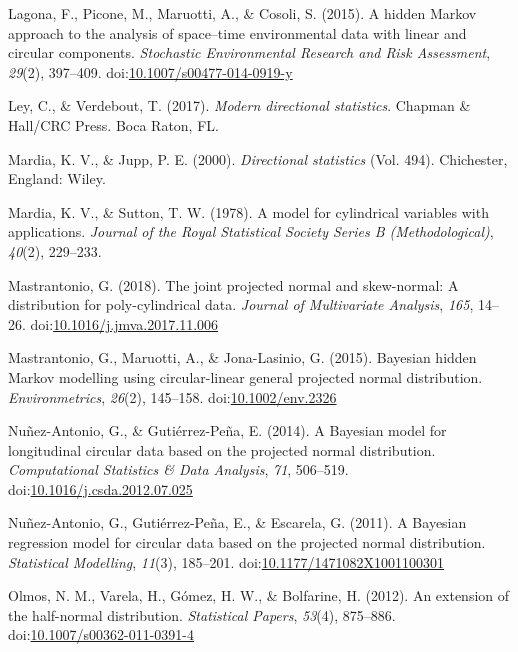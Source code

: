 \documentclass[12pt,]{article}
\begin{document}
\hypertarget{ref-lagona2015hidden}{}
Lagona, F., Picone, M., Maruotti, A., \& Cosoli, S. (2015). A hidden
Markov approach to the analysis of space--time environmental data with
linear and circular components. \emph{Stochastic Environmental Research
and Risk Assessment}, \emph{29}(2), 397--409.
doi:\href{https://doi.org/10.1007/s00477-014-0919-y}{10.1007/s00477-014-0919-y}

\hypertarget{ref-ley2017modern}{}
Ley, C., \& Verdebout, T. (2017). \emph{Modern directional statistics}.
Chapman \& Hall/CRC Press. Boca Raton, FL.

\hypertarget{ref-mardia2000directional}{}
Mardia, K. V., \& Jupp, P. E. (2000). \emph{Directional statistics}
(Vol. 494). Chichester, England: Wiley.

\hypertarget{ref-mardia1978model}{}
Mardia, K. V., \& Sutton, T. W. (1978). A model for cylindrical
variables with applications. \emph{Journal of the Royal Statistical
Society Series B (Methodological)}, \emph{40}(2), 229--233.

\hypertarget{ref-mastrantonio2018joint}{}
Mastrantonio, G. (2018). The joint projected normal and skew-normal: A
distribution for poly-cylindrical data. \emph{Journal of Multivariate
Analysis}, \emph{165}, 14--26.
doi:\href{https://doi.org/10.1016/j.jmva.2017.11.006}{10.1016/j.jmva.2017.11.006}

\hypertarget{ref-mastrantonio2015bayesian}{}
Mastrantonio, G., Maruotti, A., \& Jona-Lasinio, G. (2015). Bayesian
hidden Markov modelling using circular-linear general projected normal
distribution. \emph{Environmetrics}, \emph{26}(2), 145--158.
doi:\href{https://doi.org/10.1002/env.2326}{10.1002/env.2326}

\hypertarget{ref-nunez2014bayesian}{}
Nuñez-Antonio, G., \& Gutiérrez-Peña, E. (2014). A Bayesian model for
longitudinal circular data based on the projected normal distribution.
\emph{Computational Statistics \& Data Analysis}, \emph{71}, 506--519.
doi:\href{https://doi.org/10.1016/j.csda.2012.07.025}{10.1016/j.csda.2012.07.025}

\hypertarget{ref-nunez2011bayesian}{}
Nuñez-Antonio, G., Gutiérrez-Peña, E., \& Escarela, G. (2011). A
Bayesian regression model for circular data based on the projected
normal distribution. \emph{Statistical Modelling}, \emph{11}(3),
185--201.
doi:\href{https://doi.org/10.1177/1471082X1001100301}{10.1177/1471082X1001100301}

\hypertarget{ref-olmos2012extension}{}
Olmos, N. M., Varela, H., Gómez, H. W., \& Bolfarine, H. (2012). An
extension of the half-normal distribution. \emph{Statistical Papers},
\emph{53}(4), 875--886.
doi:\href{https://doi.org/10.1007/s00362-011-0391-4}{10.1007/s00362-011-0391-4}
\end{document}
